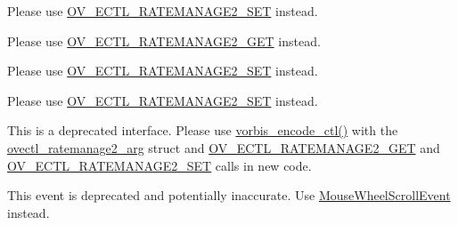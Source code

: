 
\begin{DoxyRefList}
\item[Member \mbox{\hyperlink{vorbisenc_8h_a34c3170d227b6368041e59c1dc7ed6e4}{OV\+\_\+\+ECTL\+\_\+\+RATEMANAGE\+\_\+\+AVG}} ]\label{deprecated__deprecated000004}%
%
Please use \mbox{\hyperlink{vorbisenc_8h_a5075e0acb85fd45398a290594f83d6ba}{OV\+\_\+\+ECTL\+\_\+\+RATEMANAGE2\+\_\+\+SET}} instead. 
\item[Member \mbox{\hyperlink{vorbisenc_8h_a614481c0d84bdfbb80eed9208b68f779}{OV\+\_\+\+ECTL\+\_\+\+RATEMANAGE\+\_\+\+GET}} ]\label{deprecated__deprecated000002}%
%
Please use \mbox{\hyperlink{vorbisenc_8h_af95048070bedb467f80ce85e20057126}{OV\+\_\+\+ECTL\+\_\+\+RATEMANAGE2\+\_\+\+GET}} instead. 
\item[Member \mbox{\hyperlink{vorbisenc_8h_af8869980a805f431af57a50dffbf5d33}{OV\+\_\+\+ECTL\+\_\+\+RATEMANAGE\+\_\+\+HARD}} ]\label{deprecated__deprecated000005}%
%
Please use \mbox{\hyperlink{vorbisenc_8h_a5075e0acb85fd45398a290594f83d6ba}{OV\+\_\+\+ECTL\+\_\+\+RATEMANAGE2\+\_\+\+SET}} instead. 
\item[Member \mbox{\hyperlink{vorbisenc_8h_a1daa1fd8ce1064cce01dde3ad447d389}{OV\+\_\+\+ECTL\+\_\+\+RATEMANAGE\+\_\+\+SET}} ]\label{deprecated__deprecated000003}%
%
Please use \mbox{\hyperlink{vorbisenc_8h_a5075e0acb85fd45398a290594f83d6ba}{OV\+\_\+\+ECTL\+\_\+\+RATEMANAGE2\+\_\+\+SET}} instead. 
\item[Class \mbox{\hyperlink{structovectl__ratemanage__arg}{ovectl\+\_\+ratemanage\+\_\+arg}} ]\label{deprecated__deprecated000001}%
%
This is a deprecated interface. Please use \mbox{\hyperlink{vorbisenc_8h_a5f398a378e20b8ce5e3341a582e773bd}{vorbis\+\_\+encode\+\_\+ctl()}} with the \mbox{\hyperlink{structovectl__ratemanage2__arg}{ovectl\+\_\+ratemanage2\+\_\+arg}} struct and \mbox{\hyperlink{vorbisenc_8h_af95048070bedb467f80ce85e20057126}{OV\+\_\+\+ECTL\+\_\+\+RATEMANAGE2\+\_\+\+GET}} and \mbox{\hyperlink{vorbisenc_8h_a5075e0acb85fd45398a290594f83d6ba}{OV\+\_\+\+ECTL\+\_\+\+RATEMANAGE2\+\_\+\+SET}} calls in new code. 
\item[Class \mbox{\hyperlink{structsf_1_1Event_1_1MouseWheelEvent}{sf\+::Event\+::Mouse\+Wheel\+Event}} ]\label{deprecated__deprecated000023}%
%
This event is deprecated and potentially inaccurate. Use \mbox{\hyperlink{structsf_1_1Event_1_1MouseWheelScrollEvent}{Mouse\+Wheel\+Scroll\+Event}} instead. 

\end{DoxyRefList}
